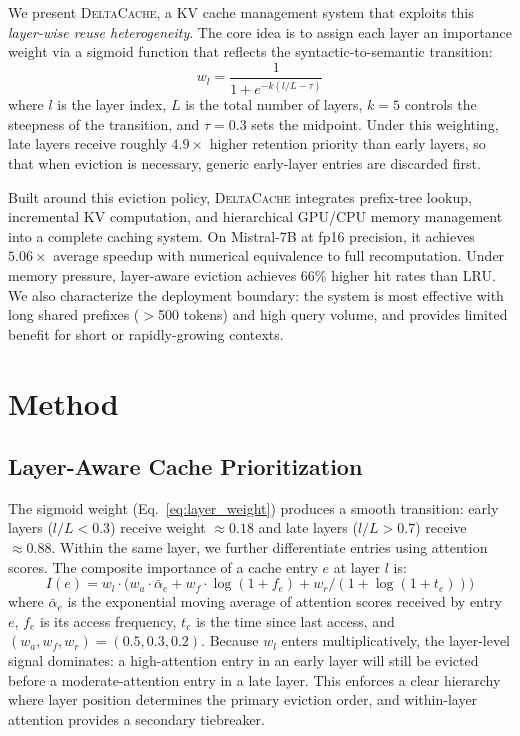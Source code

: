 \documentclass{article}
\newcommand{\deltacache}{\textsc{DeltaCache}}
\begin{document}
We present \deltacache{}, a KV cache management system that exploits this \emph{layer-wise reuse heterogeneity}. The core idea is to assign each layer an importance weight via a sigmoid function that reflects the syntactic-to-semantic transition:
\begin{equation}
w_l = \frac{1}{1 + e^{-k(l/L - \tau)}}
\label{eq:layer_weight}
\end{equation}
where $l$ is the layer index, $L$ is the total number of layers, $k{=}5$ controls the steepness of the transition, and $\tau{=}0.3$ sets the midpoint. Under this weighting, late layers receive roughly $4.9\times$ higher retention priority than early layers, so that when eviction is necessary, generic early-layer entries are discarded first.

Built around this eviction policy, \deltacache{} integrates prefix-tree lookup, incremental KV computation, and hierarchical GPU/CPU memory management into a complete caching system. On Mistral-7B at fp16 precision, it achieves $5.06\times$ average speedup with numerical equivalence to full recomputation. Under memory pressure, layer-aware eviction achieves 66\% higher hit rates than LRU. We also characterize the deployment boundary: the system is most effective with long shared prefixes ($>$500 tokens) and high query volume, and provides limited benefit for short or rapidly-growing contexts.

\section{Method}

\subsection{Layer-Aware Cache Prioritization}

The sigmoid weight (Eq.~\ref{eq:layer_weight}) produces a smooth transition: early layers ($l/L < 0.3$) receive weight ${\approx}0.18$ and late layers ($l/L > 0.7$) receive ${\approx}0.88$. Within the same layer, we further differentiate entries using attention scores. The composite importance of a cache entry $e$ at layer $l$ is:
\begin{equation}
I(e) = w_l \cdot \big( w_a \cdot \bar{\alpha}_e + w_f \cdot \log(1{+}f_e) + w_r / (1{+}\log(1{+}t_e)) \big)
\label{eq:importance}
\end{equation}
where $\bar{\alpha}_e$ is the exponential moving average of attention scores received by entry $e$, $f_e$ is its access frequency, $t_e$ is the time since last access, and $(w_a, w_f, w_r) = (0.5, 0.3, 0.2)$. Because $w_l$ enters multiplicatively, the layer-level signal dominates: a high-attention entry in an early layer will still be evicted before a moderate-attention entry in a late layer. This enforces a clear hierarchy where layer position determines the primary eviction order, and within-layer attention provides a secondary tiebreaker.
\end{document}
